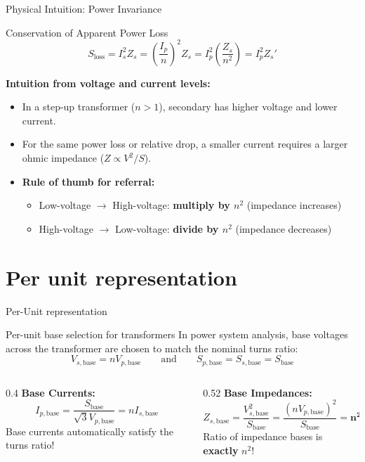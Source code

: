 \begin{frame}{Physical Intuition: Power Invariance}
\begin{block}{Conservation of Apparent Power Loss}
$$S_{\text{loss}} = I_s^2 Z_s = \left(\frac{I_p}{n}\right)^2 Z_s = I_p^2 \left(\frac{Z_s}{n^2}\right) = I_p^2 Z_s'$$
\end{block}

\vspace{0.2em}
\textbf{Intuition from voltage and current levels:}
\begin{itemize}
    \item In a step-up transformer ($n > 1$), secondary has higher voltage and \alert{lower current}.
    \item For the same power loss or relative drop, a smaller current requires a \alert{larger ohmic impedance} ($Z \propto V^2 / S$).
    \item \textbf{Rule of thumb for referral:}
    \begin{itemize}
        \item Low-voltage $\to$ High-voltage: \textbf{multiply by $n^2$} (impedance increases)
        \item High-voltage $\to$ Low-voltage: \textbf{divide by $n^2$} (impedance decreases)
    \end{itemize}
\end{itemize}
\end{frame}

\section{Per unit representation}

\begin{frame}{Per-Unit representation}
    \begin{block}{Per-unit base selection for transformers}
In power system analysis, base voltages across the transformer are chosen to match the nominal turns ratio:
$$V_{s, \text{base}} = n V_{p, \text{base}} \qquad \text{and} \qquad S_{p, \text{base}} = S_{s, \text{base}} = S_{\text{base}}$$        
    \end{block}


\begin{columns}
\begin{column}{0.4\textwidth}
\textbf{Base Currents:}
$$I_{p, \text{base}} = \frac{S_{\text{base}}}{\sqrt{3}V_{p, \text{base}}} = n I_{s, \text{base}}$$
\small Base currents automatically satisfy the turns ratio!
\end{column} 
\begin{column}{0.52\textwidth}
\textbf{Base Impedances:}
$$Z_{s, \text{base}} = \frac{V_{s, \text{base}}^2}{S_{\text{base}}} = \frac{(n V_{p, \text{base}})^2}{S_{\text{base}}} = \mathbf{n^2 Z_{p, \text{base}}}$$
\small Ratio of impedance bases is \textbf{exactly} $n^2$!
\end{column}
\end{columns}

\end{frame}

